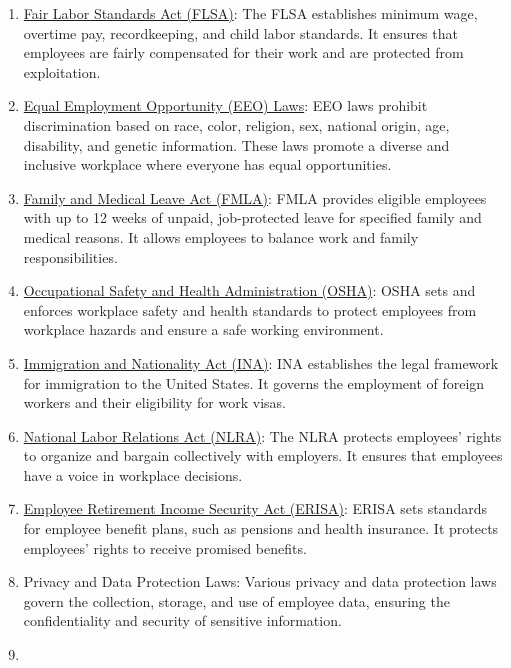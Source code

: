 \documentclass[
  a4paper,
]{book}
\providecommand{\tightlist}{%
  \setlength{\itemsep}{0pt}\setlength{\parskip}{0pt}}\usepackage{longtable,booktabs,array}
\renewcommand{\labelenumi}{\textbf{\textcolor{com-color}{\arabic*.}}}%
\begin{document}
\begin{enumerate}
\def\labelenumi{\arabic{enumi}.}
\tightlist
\item
  \href{https://www.dol.gov/agencies/whd/flsa}{Fair Labor Standards Act
  (FLSA)}: The FLSA establishes minimum wage, overtime pay,
  recordkeeping, and child labor standards. It ensures that employees
  are fairly compensated for their work and are protected from
  exploitation.
\item
  \href{https://www.eeoc.gov/laws}{Equal Employment Opportunity (EEO)
  Laws}: EEO laws prohibit discrimination based on race, color,
  religion, sex, national origin, age, disability, and genetic
  information. These laws promote a diverse and inclusive workplace
  where everyone has equal opportunities.
\item
  \href{https://www.dol.gov/agencies/whd/fmla}{Family and Medical Leave
  Act (FMLA)}: FMLA provides eligible employees with up to 12 weeks of
  unpaid, job-protected leave for specified family and medical reasons.
  It allows employees to balance work and family responsibilities.
\item
  \href{https://www.osha.gov/}{Occupational Safety and Health
  Administration (OSHA)}: OSHA sets and enforces workplace safety and
  health standards to protect employees from workplace hazards and
  ensure a safe working environment.
\item
  \href{https://www.uscis.gov/laws/immigration-and-nationality-act}{Immigration
  and Nationality Act (INA)}: INA establishes the legal framework for
  immigration to the United States. It governs the employment of foreign
  workers and their eligibility for work visas.
\item
  \href{https://www.nlrb.gov/rights-we-protect/nlra/employee-rights}{National
  Labor Relations Act (NLRA)}: The NLRA protects employees' rights to
  organize and bargain collectively with employers. It ensures that
  employees have a voice in workplace decisions.
\item
  \href{https://www.dol.gov/agencies/ebsa/laws-and-regulations/laws/erisa}{Employee
  Retirement Income Security Act (ERISA)}: ERISA sets standards for
  employee benefit plans, such as pensions and health insurance. It
  protects employees' rights to receive promised benefits.
\item
  Privacy and Data Protection Laws: Various privacy and data protection
  laws govern the collection, storage, and use of employee data,
  ensuring the confidentiality and security of sensitive information.
\item

\end{enumerate}
\end{document}
